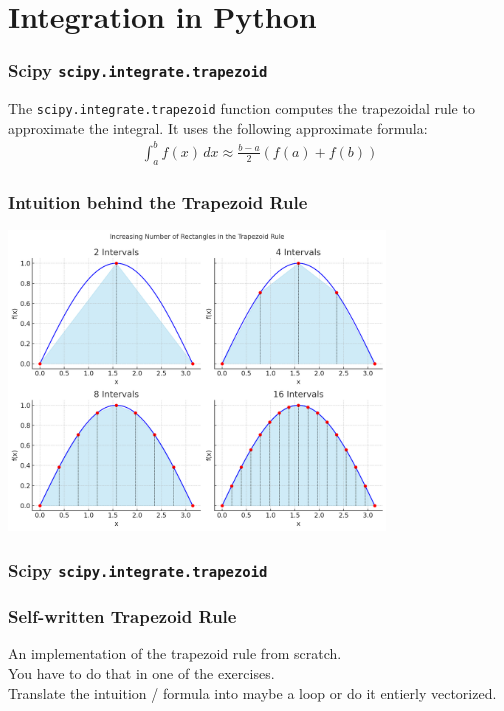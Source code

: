 \documentclass{beamer}
\begin{document}
\section{Integration in Python}
\begin{frame}
  \frametitle{Scipy \texttt{scipy.integrate.trapezoid}}
  The \texttt{scipy.integrate.trapezoid} function computes the trapezoidal rule to approximate the integral.
  \vspace{5mm}
  It uses the following approximate formula:
    \begin{align*}
        \int_{a}^{b} f(x) \, dx \approx \frac{b - a}{2} \left( f(a) + f(b) \right)
    \end{align*}
\end{frame}
\begin{frame}
    \frametitle{Intuition behind the Trapezoid Rule}
    \vspace{-5mm}
    \begin{center}
        \includegraphics[width=0.75\textwidth]{examples/fig/trap.png}
    \end{center}
\end{frame}
\begin{frame}
  \frametitle{Scipy \texttt{scipy.integrate.trapezoid}}
  
\end{frame}
\begin{frame}
  \frametitle{Self-written Trapezoid Rule}
  An implementation of the trapezoid rule from scratch.\\
  You have to do that in one of the exercises.\\ 
    \vspace{5mm}
  Translate the intuition / formula into maybe a loop or do it entierly vectorized.
\end{frame}
\end{document}
